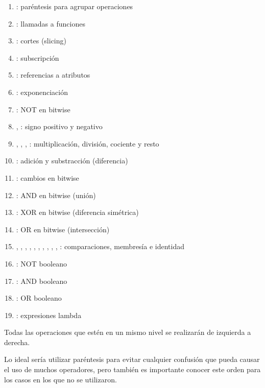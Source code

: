 \begin{enumerate}
  \item \ttt{()}: paréntesis para agrupar operaciones
  
  \item {}: llamadas a funciones
  
  \item {}: cortes (slicing)
  
  \item {}: subscripción
  
  \item {}: referencias a atributos
  
  \item \ttt{**}: exponenciación
  
  \item {}: NOT en bitwise
  
  \item {}, : signo positivo y negativo
  
  \item \ttt{*}, \ttt{/}, \ttt{//}, \ttt{\%}: multiplicación, división, cociente y resto
  
  \item \ttt{+, -}: adición y substracción (diferencia)
  
  \item \ttt{<<, >>}: cambios en bitwise
  
  \item \ttt{\&}: AND en bitwise (unión)
  
  \item \ttt{\^}: XOR en bitwise (diferencia simétrica)
  
  \item \ttt{|}: OR en bitwise (intersección)
  
  \item {}, , ,  , \ttt{<}, \ttt{<=}, \ttt{>}, \ttt{>=}, \ttt{<>}, \ttt{!=}, \ttt{==}: comparaciones, membresía e identidad
  
  \item {}: NOT booleano
  
  \item {}: AND booleano
  
  \item {}: OR booleano
  
  \item {}: expresiones lambda

\end{enumerate}

Todas las operaciones que estén en un mismo nivel se realizarán de izquierda a derecha.\smallskip

Lo ideal sería utilizar paréntesis para evitar cualquier confusión que pueda causar el uso de muchos operadores, pero también es importante conocer este orden para los casos en los que no se utilizaron.

\clearpage